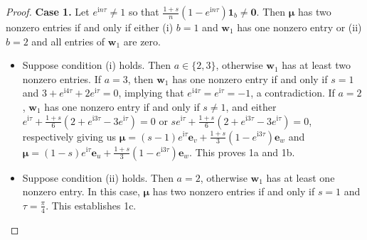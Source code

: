 \documentclass{article}
\numberwithin{equation}{section}
\newcommand{\zero}{\mathbf 0}
\newcommand{\uno}{\mathbf 1}
\newcommand{\be}{\mathbf e}
\newcommand{\bw}{\mathbf w}
\newcommand{\bmu}{{\boldsymbol{\mu}}}
\def\ii{\mathrm{i}}
\begin{document}
{\begin{proof}
\noindent \textbf{Case 1.} Let $e^{\ii n \tau}\neq 1$ so that $\frac{1+s}{n}(1-e^{\ii n \tau})\uno_b\neq \zero$. Then $\bmu$ has two nonzero entries if and only if either (i) $b=1$ and $\bw_1$ has one nonzero entry or (ii) $b=2$ and all entries of $\bw_1$ are zero.
\begin{itemize}
\item Suppose condition (i) holds. Then $a\in\{2,3\}$, otherwise $\bw_1$ has at least two nonzero entries. If $a=3$, then $\bw_1$ has one nonzero entry if and only if $s=1$ and $3+e^{\ii 4\tau}+2e^{\ii \tau}=0$, implying that $e^{\ii 4\tau}=e^{\ii \tau}=-1$, a contradiction. If $a=2$, $\bw_1$ has one nonzero entry if and only if $s\neq 1$, and either $e^{\ii\tau}+\frac{1+s}{6}(2+e^{\ii 3\tau}-3e^{\ii \tau})=0$ or $se^{\ii\tau}+\frac{1+s}{6}(2+e^{\ii 3\tau}-3e^{\ii \tau})=0$, respectively giving us $\bmu=(s-1)e^{\ii\tau}\be_v+\frac{1+s}{3}(1-e^{\ii3\tau})\be_w$ and $\bmu=(1-s)e^{\ii\tau}\be_u+\frac{1+s}{3}(1-e^{\ii3\tau})\be_w$. This proves 1a and 1b.
\item Suppose condition (ii) holds. Then $a=2$, otherwise $\bw_1$ has at least one nonzero entry. In this case, $\bmu$ has two nonzero entries if and only if $s=1$ and $\tau=\frac{\pi}{4}$. This establishes 1c.
\end{itemize}


\end{proof}}
\end{document}

